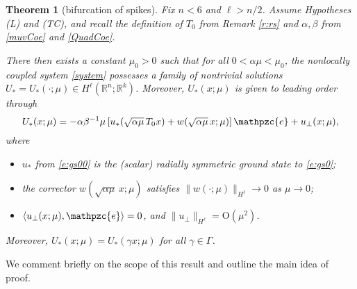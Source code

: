 \documentclass[10pt]{article}
\newtheorem{Theorem}{Theorem}
\newcommand{\R}{\mathbb{R}}
\newcommand{\rmO}{\mathrm{O}}
\newcommand{\rmo}{\mathrm{o}}
\newcommand{\K}{\mathcal{K}}
\newcommand{\e}{\mathpzc{e}}
\begin{document}
\begin{Theorem}[bifurcation of spikes]\label{MainRes} Fix $n<6$ and $\ell>n/2$.  Assume Hypotheses (L) and (TC), and recall the definition of $T_0$ from Remark \ref{r:rs} and $\alpha,\beta$ from \eqref{muvCoe} and \eqref{QuadCoe}.

There then exists a constant $\mu_0>0$ such that for all $0< \alpha\mu<\mu_0$, the nonlocally coupled system \eqref{system} possesses a  family of nontrivial solutions $U_*=U_*(\cdot;\mu) \in H^\ell(\R^n;\R^k)$. Moreover, $U_*(x;\mu)$ is given to leading order through
\begin{equation}\label{expan}
U_*(x;\mu) = {-\alpha\beta^{-1}\mu\left[ u_*(\sqrt{\alpha\mu} \,T_0 x)+w(\sqrt{\alpha\mu} \, x;\mu)\right]{\e} }+ u_{\perp}(x;\mu),
\end{equation}
where 
\begin{itemize}
\item $u_*$ from \eqref{e:gs00} is the  (scalar) radially symmetric ground state to \eqref{e:gs0};
\item the corrector ${w(\sqrt{\alpha\mu} \, x;\mu)}$ satisfies  $\|w(\cdot;\mu)\|_{H^\ell} \to 0$ as $\mu \to 0$;
\item $\langle u_{\perp}(x;\mu),{\e}\rangle=0$, and $\|u_{\perp}\|_{H^\ell} = \rmO(\mu^2)$.
\end{itemize}
Moreover, $U_*(x;\mu)=U_*(\gamma x;\mu)$ for all $\gamma\in\Gamma$. 
% 
% 
% 
\end{Theorem}

We comment briefly on the scope of this result and outline the main idea of proof. 
\end{document}
